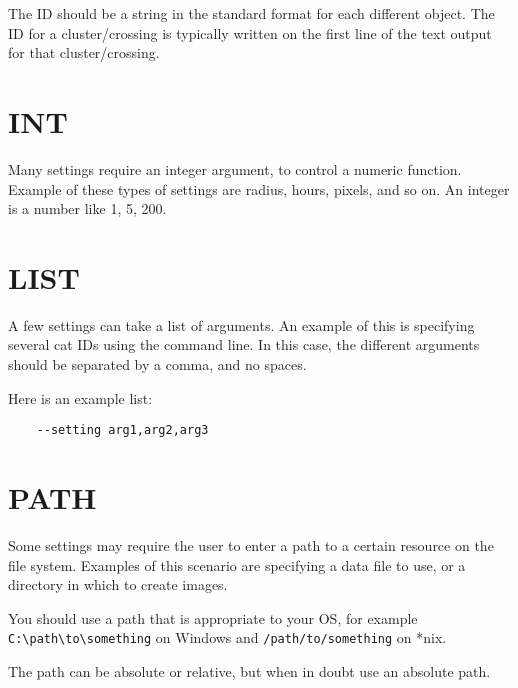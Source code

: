 The ID should be a string in the standard format for each different
object. The ID for a cluster/crossing is typically written on
the first line of the text output for that cluster/crossing.

\section{INT}
\hypertarget{argument-type-int}{}

Many settings require an integer argument, to control a numeric
function. Example of these types of settings are radius, hours,
pixels, and so on. An integer is a number like 1, 5, 200.

\section{LIST}
\hypertarget{argument-type-list}{}

A few settings can take a list of arguments. An example of this is
specifying several cat IDs using the command line. In this case,
the different arguments should be separated by a comma, and no
spaces.

Here is an example list:

\begin{verbatim}
    --setting arg1,arg2,arg3
\end{verbatim}

\section{PATH}
\hypertarget{argument-type-path}{}

Some settings may require the user to enter a path to a certain
resource on the file system. Examples of this scenario are specifying
a data file to use, or a directory in which to create images.

You should use a path that is appropriate to your OS, for example
\verb=C:\path\to\something= on Windows and \verb=/path/to/something=
on *nix.

The path can be absolute or relative, but when in doubt use an absolute
path.
